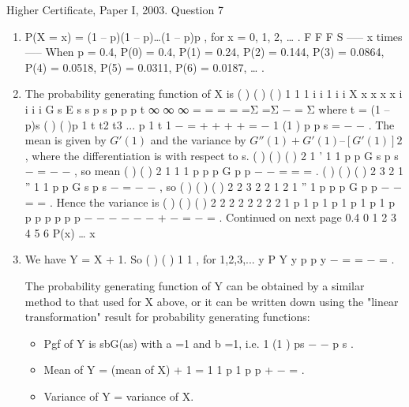 \documentclass[a4paper,12pt]{article}
\begin{document}
Higher Certificate, Paper I, 2003. Question 7
\begin{enumerate}
\item P(X = x) = (1 – p)(1 – p)…(1 – p)p , for x = 0, 1, 2, … .
F F F S
----- x times -----
  When p = 0.4, P(0) = 0.4, P(1) = 0.24, P(2) = 0.144, P(3) = 0.0864,
P(4) = 0.0518, P(5) = 0.0311, P(6) = 0.0187, … .
\item The probability generating function of X is
( ) ( ) ( )
1 1 1
i i 1 i i X x x x x
i
i i i
G s E s s p s p p p t
∞ ∞ ∞
= = =
  = =Σ =Σ − = Σ where t = (1 – p)s
( ) ( )p 1 t t2 t3 ... p 1 t 1 − = + + + + = −
1 (1 )
p
p s
=
  − −
.
The mean is given by $G'(1)$ and the variance by $G''(1) + G'(1) – [G'(1)]2$, where
the differentiation is with respect to s.
( ) ( )
{ ( ) }2
1
'
1 1
p p
G s
p s
−
=
 − −
, so mean ( ) ( )
2
1 1  1
p p p G
p p
− − = = = .
( ) ( )
{ ( ) }
2
3
2 1
''
1 1
p p
G s
p s
−
=
− −
, so ( ) ( ) ( ) 2 2
3 2
2 1 2 1
'' 1
p p p
G
p p
− −
= = .
Hence the variance is ( ) ( ) ( ) 2 2 2
2 2 2 2
2 1 p 1 p 1 p 1 p 1 p 1 p
p p p p p p
− − − − − − + − = − = .
Continued on next page
0.4
0 1 2 3 4 5 6
P(x)
…
x
\item We have Y = X + 1.
So ( ) ( ) 1 1 , for 1,2,3,... y P Y y p p y − = = − = .

The probability generating function of Y can be obtained by a similar method
to that used for X above, or it can be written down using the "linear
transformation" result for probability generating functions:
\begin{itemize}
\item 
Pgf of Y is sbG(as) with a =1 and b =1, i.e. 1 (1 )
ps
− − p s
.
\item Mean of Y = (mean of X) + 1 = 1 1 p 1
p p
+ − = .
\item Variance of Y = variance of X.
\end{itemize}
\end{enumerate}
\end{document}
